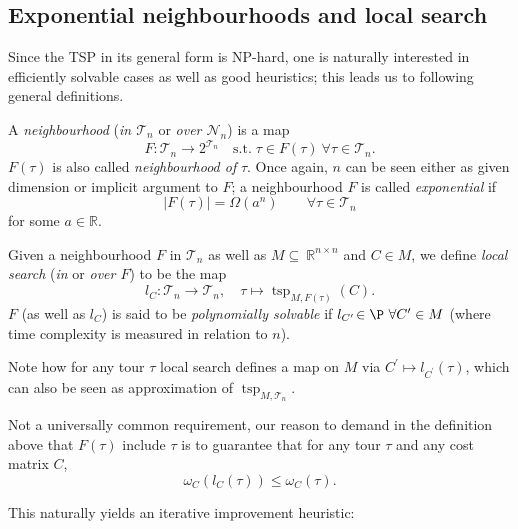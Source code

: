 \documentclass[index=totoc,bibliography=totoc]{scrartcl}
\numberwithin{equation}{section}
\numberwithin{figure}{section}
\numberwithin{table}{section}
\let\defstyle\itshape
\begin{document}
\subsection{Exponential neighbourhoods and local search}

Since the TSP in its general form is NP-hard, one is naturally interested
in efficiently solvable cases as well as good heuristics; this leads us to
following general definitions.

\begin{define}
  A {\defstyle neighbourhood}
  ({\defstyle in $\mathcal{T}_n$} or {\defstyle over $\mathcal{N}_n$}) is a map
  \[
    F: \mathcal{T}_n \to 2^{\mathcal{T}_n}
    \quad \text{s.t.}\; \tau \in F\left(\tau\right) \ \forall \tau \in \mathcal{T}_n.
  \]
  $F(\tau)$ is also called {\defstyle neighbourhood of} $\tau$.
  Once again, $n$ can be seen either as given dimension or implicit
  argument to $F$; a neighbourhood $F$ is called {\defstyle exponential} if
  \[
    \left\vert F(\tau) \right\vert = \Omega(a^n) \qquad \forall \tau \in \mathcal{T}_n
  \]
  for some $a \in \mathbb{R}$.
\end{define}

\begin{define}
  Given a neighbourhood $F$ in $\mathcal{T}_n$
  as well as $M \subseteq~\mathbb{R}^{n \times n}$ and $C \in M$,
  we define {\defstyle local search}
  ({\defstyle in} or {\defstyle over $F$}) to be the map
  \[
    l_C :
    \mathcal{T}_n \to \mathcal{T}_n, \quad
    \tau \mapsto \operatorname{tsp}_{M,F(\tau)}\left(C\right).
  \]
  $F$ (as well as $l_C$) is said to be {\defstyle polynomially solvable} if
  $l_{C^\prime}\!\in \P \ \forall C^\prime \in M$
  (where time complexity is measured in relation to $n$).
\end{define}

Note how for any tour $\tau$ local search defines a map on $M$ via
$C^\prime \mapsto l_{C^\prime}\left(\tau\right)$, which can also be seen as
approximation of $\operatorname{tsp}_{M,\mathcal{T}_n}$.

\begin{remark}
  Not a universally common requirement, our reason to demand in the
  definition above that
  $F\left(\tau\right)$ include $\tau$ is to guarantee
  that for any tour $\tau$ and any cost matrix $C$,
  \[
    \omega_C\left(l_C\left(\tau\right)\right) \leq \omega_C\left(\tau\right).
  \]
\end{remark}
This naturally yields an iterative improvement heuristic:
\end{document}
